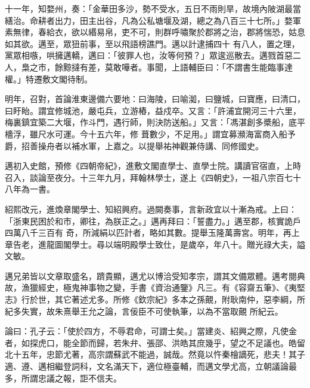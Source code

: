 \begin{pinyinscope}
 十一年，知婺州，奏：「金華田多沙，勢不受水，五日不雨則旱，故境內陂湖最當繕治。命耕者出力，田主出谷，凡為公私塘堰及湖，總之為八百三十七所。」婺軍素無律，春給衣，欲以緡易帛，吏不可，則群呼嘯聚於郡將之治，郡將惴恐，姑息如其欲。邁至，眾狃前事，至以飛語榜譙門。邁以計逮捕四十
 有八人，置之理，黨眾相嗾，哄擁邁轎，邁曰：「彼罪人也，汝等何預？」眾逡巡散去。邁戮首惡二人，梟之市，餘黥撻有差，莫敢嘩者。事聞，上語輔臣曰：「不謂書生能臨事達權。」特遷敷文閣待制。



 明年，召對，首論淮東邊備六要地：曰海陵，曰喻洳，曰鹽城，曰寶應，曰清口，曰盱眙。謂宜修城池，嚴屯兵，立游樁，益戍卒。又言：「許浦宜開河三十六里，梅裏鎮宜築二大堰，作斗門，遇行師，則決防送船。」又言：「馮湛創多槳船，底平檣浮，雖尺水可運。今十五六年，修
 葺數少，不足用。」謂宜募瀕海富商入船予爵，招善操舟者以補水軍，上嘉之。以提舉祐神觀兼侍講、同修國史。



 邁初入史館，預修《四朝帝紀》，進敷文閣直學士、直學士院。講讀官宿直，上時召入，談論至夜分。十三年九月，拜翰林學士，遂上《四朝史》，一祖八宗百七十八年為一書。



 紹熙改元，進煥章閣學士、知紹興府。過闕奏事，言新政宜以十漸為戒。上曰：「浙東民困於和市，卿往，為朕正之。」邁再拜曰：「誓盡力。」邁至郡，核實詭戶四萬八千三百有
 奇，所減絹以匹計者，略如其數。提舉玉隆萬壽宮。明年，再上章告老，進龍圖閣學士。尋以端明殿學士致仕，是歲卒，年八十。贈光祿大夫，謚文敏。



 邁兄弟皆以文章取盛名，躋貴顯，邁尤以博洽受知孝宗，謂其文備眾體。邁考閱典故，漁獵經史，極鬼神事物之變，手書《資治通鑒》凡三。有《容齋五筆》、《夷堅志》行於世，其它著述尤多。所修《欽宗紀》多本之孫覿，附耿南仲，惡李綱，所紀多失實，故朱熹舉王允之論，言佞臣不可使執筆，以為不當取覿
 所紀云。



 論曰：孔子云：「使於四方，不辱君命，可謂士矣。」當建炎、紹興之際，凡使金者，如探虎口，能全節而歸，若朱弁、張邵、洪皓其庶幾乎，望之不足議也。皓留北十五年，忠節尤著，高宗謂蘇武不能過，誠哉。然竟以忤秦檜謫死，悲夫！其子適、遵、邁相繼登詞科，文名滿天下，適位極臺輔，而邁文學尤高，立朝議論最多，所謂忠議之報，詎不信夫。



\end{pinyinscope}